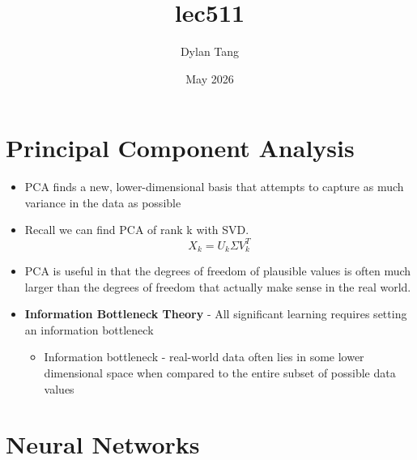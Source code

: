 \documentclass{article}
\title{lec511}
\author{Dylan Tang}
\date{May 2026}
\begin{document}
\maketitle

\section{Principal Component Analysis}
\begin{itemize}
    \item PCA finds a new, lower-dimensional basis that attempts to capture as much variance in the data as possible
        \item Recall we can find PCA of rank k with SVD.
        \[ 
            X_k = U_k\Sigma V_k^T
        \]
    \item PCA is useful in that the degrees of freedom of plausible values is often much larger than the degrees of freedom that actually make sense in the real world.
    \item \textbf{Information Bottleneck Theory} - All significant learning requires setting an information bottleneck
        \begin{itemize}
            \item Information bottleneck - real-world data often lies in some lower dimensional space when compared to the entire subset of possible data values
        \end{itemize}
\end{itemize}
\section{Neural Networks}
\end{document}

